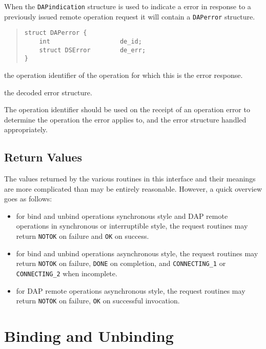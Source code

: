 When the \verb"DAPindication" structure is used to indicate a error
in response to a previously issued remote operation request
it will contain a \verb"DAPerror" structure.

\label{DAPerror}
\begin{quote}\small\begin{verbatim}
struct DAPerror {
    int                   de_id;
    struct DSError        de_err;
}
\end{verbatim}\end{quote}

\begin{describe}
\item [\verb"de\_id":]
the operation identifier of the operation for which this is the error
response.

\item [\verb"de\_err":]
the decoded error structure.
\end{describe}

The operation identifier should be used on the receipt of an operation
error to determine the operation the error applies to, and the
error structure handled appropriately.

\subsection {Return Values}

The values returned by the various routines in this interface and
their meanings are more complicated than may be entirely reasonable.
However, a quick overview goes as follows:
\begin {itemize}
\item
for bind and unbind operations synchronous style and DAP remote
operations in synchronous or interruptible style, the request routines
may return \verb"NOTOK" on failure and \verb"OK" on success.

\item
for bind and unbind operations asynchronous style, the request routines
may return \verb"NOTOK" on failure, \verb"DONE" on completion, and
\verb"CONNECTING_1" or 
\verb"CONNECTING_2" when incomplete.

\item
for DAP remote operations asynchronous style, the request routines
may return \verb"NOTOK" on failure, \verb"OK" on successful invocation.
\end{itemize}

\section {Binding and Unbinding}

